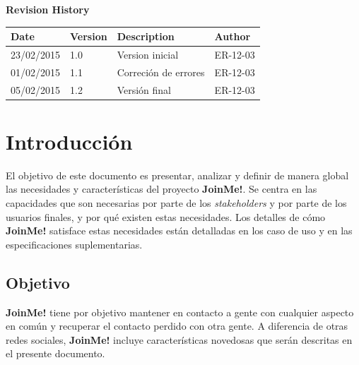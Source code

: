 \documentclass[12pt, a4paper, titlepage]{article}
\begin{document}
\begin{titlepage}
\vspace{2cm}
\begin{center}
	\large{\textbf{Revision History}}
	
    \begin{tabular}{ | p{4cm} | p{2cm} | p{5cm} | p{4cm} |}
    \hline
    \textbf{Date} & \textbf{Version} & \textbf{Description} & \textbf{Author} \\ \hline
    23/02/2015 &  1.0 & Version inicial & ER-12-03 \\ \hline
    01/02/2015 & 1.1 & Correción de errores & ER-12-03 \\ \hline
    05/02/2015 & 1.2 & Versión final & ER-12-03 \\ \hline
    \end{tabular}
\end{center}

\end{titlepage}
\clearpage


\tableofcontents
\newpage

\section{Introducción}

El objetivo de este documento es presentar, analizar y definir de manera global las necesidades y características del proyecto \textbf{JoinMe!}. Se centra en las capacidades que son necesarias por parte de los \textit{stakeholders} y por parte de los usuarios finales, y por qué existen estas necesidades. Los detalles de cómo \textbf{JoinMe!} satisface estas necesidades están detalladas en los caso de uso y en las especificaciones suplementarias.


\subsection{Objetivo}

\textbf{JoinMe!} tiene por objetivo mantener en contacto a gente con cualquier aspecto en común y recuperar el contacto perdido con otra gente. A diferencia de otras redes sociales, \textbf{JoinMe!} incluye características novedosas que serán descritas en el presente documento.
\end{document}

